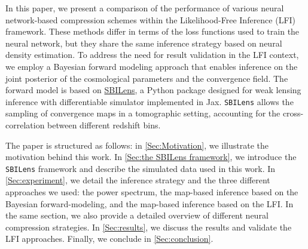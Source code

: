 \documentclass{aa}
\begin{document}
In this paper, we present a comparison of the performance of various neural network-based compression schemes within the Likelihood-Free Inference (LFI) framework. These methods differ in terms of the loss functions used to train the neural network, but they share the same inference strategy based on neural density estimation. To address the need for result validation in the LFI context, we employ a Bayesian forward modeling approach that enables inference on the joint posterior of the cosmological parameters and the convergence field. The forward model is based on \href{https://github.com/DifferentiableUniverseInitiative/sbi_lens}{\url{SBILens}}, a Python package designed for weak lensing inference with differentiable simulator implemented in Jax. \texttt{SBILens} allows the sampling of convergence maps in a tomographic setting, accounting for the cross-correlation between different redshift bins.



The paper is structured as follows: in \autoref{Sec:Motivation}, we illustrate the motivation behind this work. In \autoref{Sec:the SBILens framework}, we introduce the \texttt{SBILens} framework and describe the simulated data used in this work. In \autoref{Sec:experiment}, we detail the inference strategy and the three different approaches we used: the power spectrum, the map-based inference based on the Bayesian forward-modeling, and the map-based inference based on the LFI. In the same section, we also provide a detailed overview of different neural compression strategies. In \autoref{Sec:results}, we discuss the results and validate the LFI approaches. Finally, we conclude in \autoref{Sec:conclusion}. 
\end{document}
